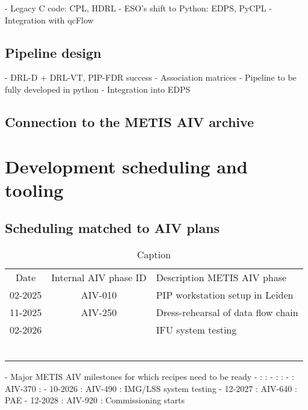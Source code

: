 \documentclass[]{spie}  %
\begin{document}
	- Legacy C code: CPL, HDRL
	- ESO's shift to Python: EDPS, PyCPL
	- Integration with qcFlow

\subsection{Pipeline design}
\label{ssec:imp_pip}

	- DRL-D + DRL-VT, PIP-FDR success
	- Association matrices
	- Pipeline to be fully developed in python 
	- Integration into EDPS
 
\subsection{Connection to the METIS AIV archive}
\label{ssec:imp_archive}


\section{Development scheduling and tooling}
\label{sec:development}

\subsection{Scheduling matched to AIV plans}
\label{ssec:dev_aiv}

\begin{table}[]
    \centering
\caption{Caption}
\label{tab:dev_aiv_milestones}
    \begin{tabular}{c|cl}
         Date&   Internal AIV phase ID&Description METIS AIV phase\\
         02-2025&   AIV-010&PIP workstation setup in Leiden\\
         11-2025&   AIV-250&Dress-rehearsal of data flow chain\\
 02-2026& &IFU system testing\\
 &  &\\
 & &\\
 & &\\
 & &\\
 & &\\
 & &\\
 \end{tabular}
   
   
\end{table}


 - Major METIS AIV milestones for which recipes need to be ready
		-  :  : 
		-  :  : 
		-  : AIV-370 : 
		- 10-2026 : AIV-490 : IMG/LSS system testing
		- 12-2027 : AIV-640 : PAE
		- 12-2028 : AIV-920 : Commissioning starts
\end{document}

